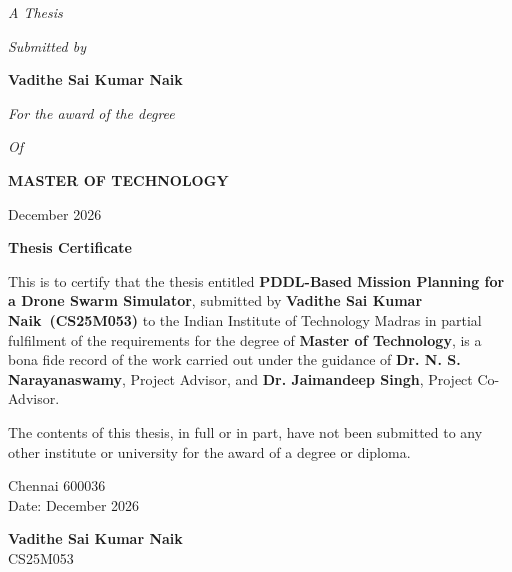 \documentclass[11pt,a4paper,oneside]{report}
\newcommand{\thesistitle}{PDDL-Based Mission Planning for a Drone Swarm Simulator}
\newcommand{\authorname}{Vadithe Sai Kumar Naik}
\newcommand{\rollno}{CS25M053}
\newcommand{\submitdate}{December 2026}
\newcommand{\advisor}{Dr. N. S. Narayanaswamy}
\newcommand{\coadvisor}{Dr. Jaimandeep Singh}
\begin{document}
\begin{titlepage}
\begin{center}
  \vspace{0.9cm}
  {\itshape A Thesis\par}
  \vspace{0.25cm}
  {\itshape Submitted by\par}
  \vspace{0.3cm}
  {\Large\bfseries \authorname\par}
  \vspace{0.5cm}
  {\itshape For the award of the degree\par}
  \vspace{0.25cm}
  {\itshape Of\par}
  \vspace{0.25cm}
  {\bfseries MASTER OF TECHNOLOGY\par}
  \vspace{0.2cm}
  \submitdate
\end{center}
\end{titlepage}

\thispagestyle{empty}
\begin{center}
  {\LARGE\bfseries Thesis Certificate\par}
\end{center}
\vspace{0.8cm}
\noindent This is to certify that the thesis entitled \textbf{\thesistitle}, submitted by
\textbf{\authorname\ (\rollno)} to the Indian Institute of Technology Madras in partial
fulfilment of the requirements for the degree of \textbf{Master of Technology}, is a bona fide
record of the work carried out under the guidance of \textbf{\advisor}, Project Advisor, and
\textbf{\coadvisor}, Project Co-Advisor.

\noindent The contents of this thesis, in full or in part, have not been submitted to any other
institute or university for the award of a degree or diploma.

\vspace{2.2cm}
\noindent
\begin{minipage}[t]{0.5\textwidth}
  Chennai 600036\\
  Date: \submitdate
\end{minipage}%
\begin{minipage}[t]{0.5\textwidth}
  \raggedleft{}
  \textbf{\authorname}\\
  \rollno
\end{minipage}
\end{document}
